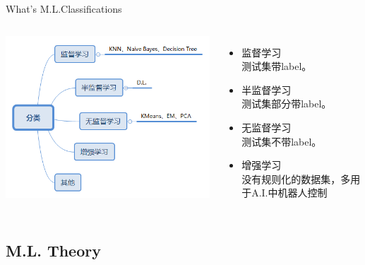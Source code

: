 \documentclass{beamer}
\begin{document}
\begin{frame}{What\rq{}s M.L.}{\quad\quad\quad Classifications}

\begin{columns}


\includegraphics[scale=0.45]{fig/Class.png}


   \begin{itemize}
  \item 监督学习\\测试集带label。
  \item 半监督学习\\测试集部分带label。
  \item 无监督学习\\测试集不带label。
  \item 增强学习\\没有规则化的数据集，多用于A.I.中机器人控制
  \end{itemize}

\end{columns}
\end{frame}


\subsection{M.L. Theory}
\end{document}
